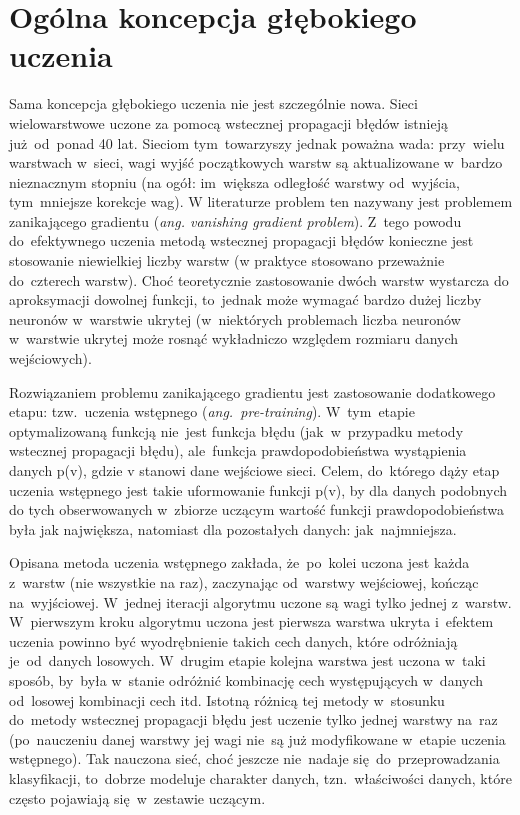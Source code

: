 \section{Ogólna koncepcja głębokiego uczenia}
Sama koncepcja głębokiego uczenia nie jest szczególnie nowa. Sieci
wielowarstwowe uczone za pomocą wstecznej propagacji błędów istnieją
już~od~ponad 40 lat. Sieciom tym~towarzyszy jednak poważna wada: przy~wielu
warstwach w~sieci, wagi wyjść początkowych warstw są aktualizowane w~bardzo
nieznacznym stopniu (na ogół: im~większa odległość warstwy od~wyjścia,
tym~mniejsze korekcje wag). W literaturze problem ten nazywany jest problemem
zanikającego gradientu (\textit{ang. vanishing gradient problem}). Z~tego
powodu do~efektywnego uczenia metodą wstecznej propagacji błędów konieczne jest
stosowanie niewielkiej liczby warstw (w praktyce stosowano przeważnie
do~czterech warstw). Choć teoretycznie zastosowanie dwóch warstw
wystarcza do aproksymacji dowolnej funkcji, to~jednak może wymagać bardzo dużej
liczby neuronów w~warstwie ukrytej (w~niektórych problemach liczba neuronów w~warstwie ukrytej może rosnąć
wykładniczo względem rozmiaru danych wejściowych).

Rozwiązaniem problemu zanikającego gradientu jest zastosowanie dodatkowego
etapu: tzw.~uczenia wstępnego (\textit{ang.~pre-training}). W~tym~etapie
optymalizowaną funkcją nie~jest funkcja błędu (jak~w~przypadku metody wstecznej
propagacji błędu), ale~funkcja prawdopodobieństwa wystąpienia danych p(v),
gdzie v stanowi dane wejściowe sieci. Celem, do~którego dąży etap uczenia
wstępnego jest takie uformowanie funkcji p(v), by dla danych podobnych do tych obserwowanych w~zbiorze
uczącym wartość funkcji prawdopodobieństwa była jak największa, natomiast dla pozostałych danych:
jak~najmniejsza.

Opisana metoda uczenia wstępnego zakłada, że~po~kolei uczona jest każda
z~warstw (nie wszystkie na raz), zaczynając od~warstwy wejściowej, kończąc
na~wyjściowej. W~jednej iteracji algorytmu uczone są wagi tylko jednej z~warstw.
W~pierwszym kroku algorytmu uczona jest pierwsza warstwa ukryta i~efektem
uczenia powinno być wyodrębnienie takich cech danych, które odróżniają
je~od~danych losowych. W~drugim etapie kolejna warstwa jest uczona w~taki
sposób, by~była w~stanie odróżnić kombinację cech występujących w~danych
od~losowej kombinacji cech itd. Istotną różnicą tej metody w~stosunku do~metody
wstecznej propagacji błędu jest uczenie tylko jednej warstwy na~raz
(po~nauczeniu danej warstwy jej wagi nie~są już modyfikowane w~etapie uczenia
wstępnego). Tak nauczona sieć, choć jeszcze nie~nadaje się~do~przeprowadzania
klasyfikacji, to~dobrze modeluje charakter danych, tzn.~właściwości danych,
które często pojawiają się~w~zestawie uczącym.

